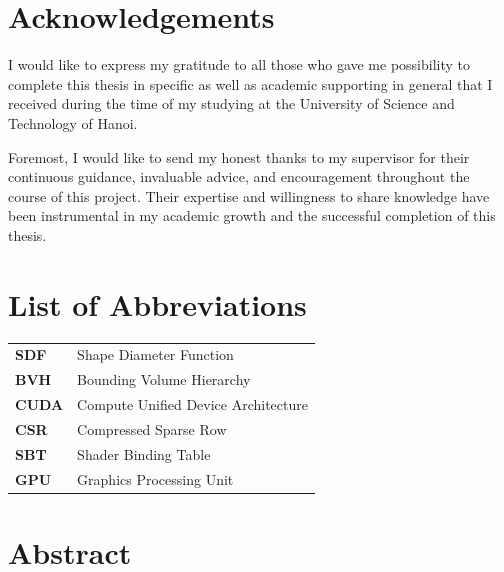\documentclass[12pt,a4paper]{report}
\begin{document}



\tableofcontents
\clearpage

\chapter*{Acknowledgements}
I would like to express my gratitude to all those who gave me possibility to complete this thesis in specific as well as academic supporting in general that I received during the time of my studying at the University of Science and Technology of Hanoi.

Foremost, I would like to send my honest thanks to my supervisor for their continuous guidance, invaluable advice, and encouragement throughout the course of this project. Their expertise and willingness to share knowledge have been instrumental in my academic growth and the successful completion of this thesis.

\chapter*{List of Abbreviations}
\vspace{1cm}
\begin{tabular}{ll}

    \textbf{SDF} & Shape Diameter Function \\[1em]
    \textbf{BVH} & Bounding Volume Hierarchy \\[1em]
    \textbf{CUDA} & Compute Unified Device Architecture \\[1em]
    \textbf{CSR} & Compressed Sparse Row \\[1em]
    \textbf{SBT} & Shader Binding Table \\[1em]
    \textbf{GPU} & Graphics Processing Unit \\
\end{tabular}

\listoftables
{}

\listoffigures
{}

\chapter*{Abstract}
\end{document}

